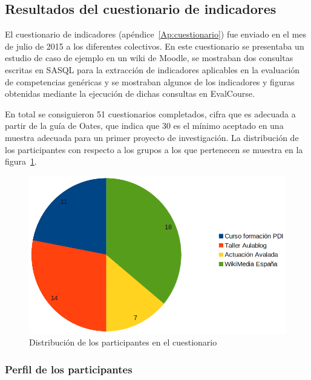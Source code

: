 \subsection{Resultados del cuestionario de indicadores}

El cuestionario de indicadores (apéndice~\ref{Ap:cuestionario}) fue enviado en el mes de julio de 2015 a los diferentes colectivos. En este cuestionario se presentaba un estudio de caso de ejemplo en un wiki de Moodle, se mostraban dos consultas escritas en SASQL para la extracción de indicadores aplicables en la evaluación de competencias genéricas y se mostraban algunos de los indicadores y figuras obtenidas mediante la ejecución de dichas consultas en EvalCourse. 

En total se consiguieron 51 cuestionarios completados, cifra que es adecuada a partir de la guía de Oates, que indica que 30 es el mínimo aceptado en una muestra adecuada para un primer proyecto de investigación. La distribución de los participantes con respecto a los grupos a los que pertenecen se muestra en la figura~\ref{fig:ResultadosParticipantes}.

\begin{figure}
  \begin{center}
    \includegraphics[scale=0.4]{ResultadosParticipantesNew.png}
  \end{center}
  \caption{Distribución de los participantes en el cuestionario}
  \label{fig:ResultadosParticipantes}
\end{figure}

\subsubsection*{Perfil de los participantes}

